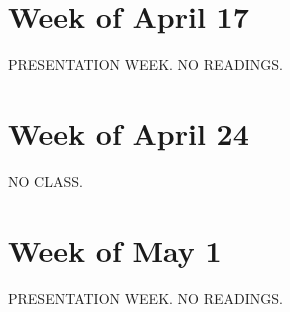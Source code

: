 \documentclass[12pt, notitlepage]{article}   	%
\begin{document}
{\section*{Week of April 17}
PRESENTATION WEEK. NO READINGS.

\section*{Week of April 24}
NO CLASS.

\section*{Week of May 1}
PRESENTATION WEEK. NO READINGS.

} %
\end{document}
